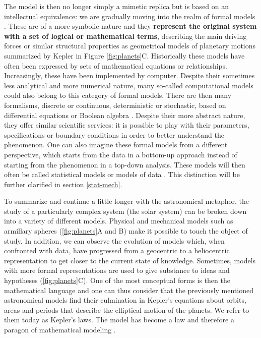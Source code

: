 \documentclass[a4paper,12pt,twoside,onecolumn,openright,final,oldfontcommands]{memoir}
\begin{document}
The model is then no longer simply a mimetic replica but is based on an
intellectual equivalence: we are gradually moving into the realm of
formal models \citep{rosenblueth1945role}. These are of a more symbolic
nature and they \textbf{represent the original system with a set of
logical or mathematical terms}, describing the main driving forces or
similar structural properties as geometrical models of planetary motions
summarized by Kepler in Figure \ref{fig:planets}C. Historically these
models have often been expressed by sets of mathematical equations or
relationships. Increasingly, these have been implemented by computer.
Despite their sometimes less analytical and more numerical nature, many
so-called computational models could also belong to this category of
formal models. There are then many formalisms, discrete or continuous,
deterministic or stochastic, based on differential equations or Boolean
algebra \citep{fowler1997mathematical}. Despite their more abstract
nature, they offer similar scientific services: it is possible to play
with their parameters, specifications or boundary conditions in order to
better understand the phenomenon. One can also imagine these formal
models from a different perspective, which starts from the data in a
bottom-up approach instead of starting from the phenomenon in a top-down
analysis. These models will then often be called statistical models or
models of data \citep{frigg2020models}. This distinction will be further
clarified in section \ref{stat-mech}.

To summarize and continue a little longer with the astronomical
metaphor, the study of a particularly complex system (the solar system)
can be broken down into a variety of different models. Physical and
mechanical models such as armillary spheres (\ref{fig:planets}A and B)
make it possible to touch the object of study. In addition, we can
observe the evolution of models which, when confronted with data, have
progressed from a geocentric to a heliocentric representation to get
closer to the current state of knowledge. Sometimes, models with more
formal representations are used to give substance to ideas and
hypotheses (\ref{fig:planets}C). One of the most conceptual forms is
then the mathematical language and one can thus consider that the
previously mentioned astronomical models find their culmination in
Kepler's equations about orbits, areas and periods that describe the
elliptical motion of the planets. We refer to them today as Kepler's
laws. The model has become a law and therefore a paragon of mathematical
modeling \citep{wan2018mathematical}.
\end{document}
